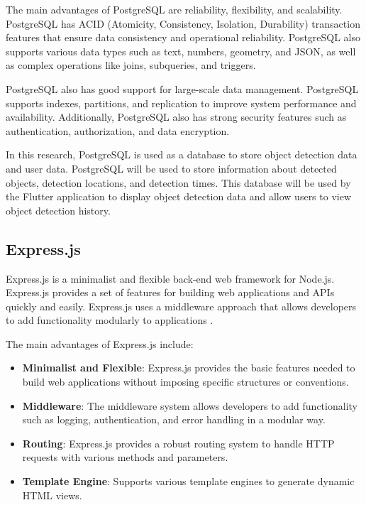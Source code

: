 The main advantages of PostgreSQL are reliability, flexibility, and scalability. PostgreSQL has ACID (Atomicity, Consistency, Isolation, Durability) transaction features that ensure data consistency and operational reliability. PostgreSQL also supports various data types such as text, numbers, geometry, and JSON, as well as complex operations like joins, subqueries, and triggers.

PostgreSQL also has good support for large-scale data management. PostgreSQL supports indexes, partitions, and replication to improve system performance and availability. Additionally, PostgreSQL also has strong security features such as authentication, authorization, and data encryption.

In this research, PostgreSQL is used as a database to store object detection data and user data. PostgreSQL will be used to store information about detected objects, detection locations, and detection times. This database will be used by the Flutter application to display object detection data and allow users to view object detection history.

\subsection{\textbf{Express.js}}

Express.js is a minimalist and flexible back-end web framework for Node.js. Express.js provides a set of features for building web applications and APIs quickly and easily. Express.js uses a middleware approach that allows developers to add functionality modularly to applications \cite{expressjs2024}.

The main advantages of Express.js include:
\begin{itemize}[nolistsep]
  \item \textbf{Minimalist and Flexible}: Express.js provides the basic features needed to build web applications without imposing specific structures or conventions.
  \item \textbf{Middleware}: The middleware system allows developers to add functionality such as logging, authentication, and error handling in a modular way.
  \item \textbf{Routing}: Express.js provides a robust routing system to handle HTTP requests with various methods and parameters.
  \item \textbf{Template Engine}: Supports various template engines to generate dynamic HTML views.
\end{itemize}

